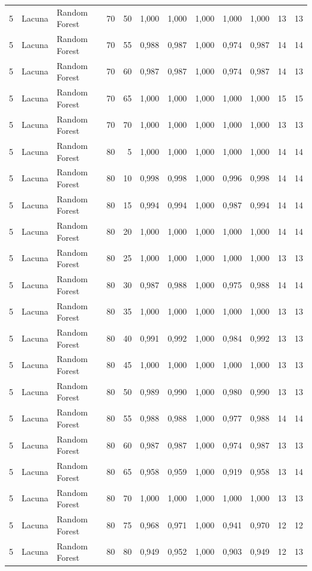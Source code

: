 \begin{longtable}{@{}rllrrrrrrrrr@{}}
5 & Lacuna & Random Forest & 70 & 50 & 1,000 & 1,000 & 1,000 & 1,000 & 1,000 & 13 & 13 \\
5 & Lacuna & Random Forest & 70 & 55 & 0,988 & 0,987 & 1,000 & 0,974 & 0,987 & 14 & 14 \\
5 & Lacuna & Random Forest & 70 & 60 & 0,987 & 0,987 & 1,000 & 0,974 & 0,987 & 14 & 13 \\
5 & Lacuna & Random Forest & 70 & 65 & 1,000 & 1,000 & 1,000 & 1,000 & 1,000 & 15 & 15 \\
5 & Lacuna & Random Forest & 70 & 70 & 1,000 & 1,000 & 1,000 & 1,000 & 1,000 & 13 & 13 \\
5 & Lacuna & Random Forest & 80 & 5 & 1,000 & 1,000 & 1,000 & 1,000 & 1,000 & 14 & 14 \\
5 & Lacuna & Random Forest & 80 & 10 & 0,998 & 0,998 & 1,000 & 0,996 & 0,998 & 14 & 14 \\
5 & Lacuna & Random Forest & 80 & 15 & 0,994 & 0,994 & 1,000 & 0,987 & 0,994 & 14 & 14 \\
5 & Lacuna & Random Forest & 80 & 20 & 1,000 & 1,000 & 1,000 & 1,000 & 1,000 & 14 & 14 \\
5 & Lacuna & Random Forest & 80 & 25 & 1,000 & 1,000 & 1,000 & 1,000 & 1,000 & 13 & 13 \\
5 & Lacuna & Random Forest & 80 & 30 & 0,987 & 0,988 & 1,000 & 0,975 & 0,988 & 14 & 14 \\
5 & Lacuna & Random Forest & 80 & 35 & 1,000 & 1,000 & 1,000 & 1,000 & 1,000 & 13 & 13 \\
5 & Lacuna & Random Forest & 80 & 40 & 0,991 & 0,992 & 1,000 & 0,984 & 0,992 & 13 & 13 \\
5 & Lacuna & Random Forest & 80 & 45 & 1,000 & 1,000 & 1,000 & 1,000 & 1,000 & 13 & 13 \\
5 & Lacuna & Random Forest & 80 & 50 & 0,989 & 0,990 & 1,000 & 0,980 & 0,990 & 13 & 13 \\
5 & Lacuna & Random Forest & 80 & 55 & 0,988 & 0,988 & 1,000 & 0,977 & 0,988 & 14 & 14 \\
5 & Lacuna & Random Forest & 80 & 60 & 0,987 & 0,987 & 1,000 & 0,974 & 0,987 & 13 & 13 \\
5 & Lacuna & Random Forest & 80 & 65 & 0,958 & 0,959 & 1,000 & 0,919 & 0,958 & 13 & 14 \\
5 & Lacuna & Random Forest & 80 & 70 & 1,000 & 1,000 & 1,000 & 1,000 & 1,000 & 13 & 13 \\
5 & Lacuna & Random Forest & 80 & 75 & 0,968 & 0,971 & 1,000 & 0,941 & 0,970 & 12 & 12 \\
5 & Lacuna & Random Forest & 80 & 80 & 0,949 & 0,952 & 1,000 & 0,903 & 0,949 & 12 & 13 \\

\end{longtable}
